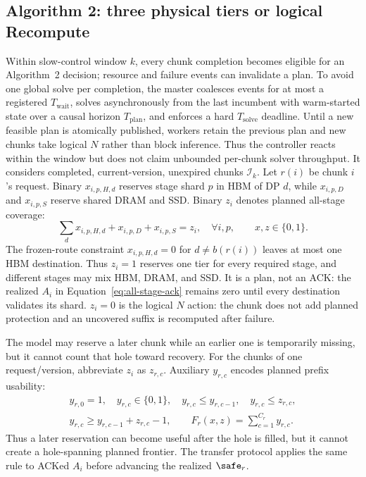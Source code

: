 \subsection{Algorithm 2: three physical tiers or logical Recompute}
\label{sec:alg2}

Within slow-control window $k$, every chunk completion becomes eligible for an
Algorithm~2 decision; resource and failure events can invalidate a plan.  To
avoid one global solve per completion, the master coalesces events for at most
a registered $T_{\mathrm{wait}}$, solves asynchronously from the last incumbent
with warm-started state over a causal horizon $T_{\mathrm{plan}}$, and enforces
a hard $T_{\mathrm{solve}}$ deadline.
Until a new feasible plan is atomically published, workers retain the previous
plan and new chunks take logical $N$ rather than block inference.  Thus the
controller reacts within the window but does not claim unbounded per-chunk
solver throughput.  It considers completed, current-version, unexpired chunks
$\mathcal I_k$.  Let $r(i)$ be chunk $i$'s request.  Binary
$x_{i,p,H,d}$ reserves stage shard $p$ in HBM of DP $d$, while $x_{i,p,D}$ and
$x_{i,p,S}$ reserve shared DRAM and SSD.  Binary $z_i$ denotes planned
all-stage coverage:
\begin{equation}
  \sum_d x_{i,p,H,d}+x_{i,p,D}+x_{i,p,S}=z_i,
  \quad \forall i,p,\qquad x,z\in\{0,1\}.
  \label{eq:actions}
\end{equation}
The frozen-route constraint $x_{i,p,H,d}=0$ for $d\ne b(r(i))$ leaves at most
one HBM destination.  Thus $z_i=1$ reserves one tier for every required stage,
and different stages may mix HBM, DRAM, and SSD.  It is a plan, not an ACK:
the realized $A_i$ in Equation~\ref{eq:all-stage-ack} remains zero until every
destination validates its shard.  $z_i=0$ is the logical $N$ action: the chunk
does not add planned protection and an uncovered suffix is recomputed after
failure.

The model may reserve a later chunk while an earlier one is temporarily
missing, but it cannot count that hole toward recovery.  For the chunks of one
request/version, abbreviate $z_i$ as $z_{r,c}$.  Auxiliary $y_{r,c}$ encodes
planned prefix usability:
\begin{equation}
  \begin{gathered}
  y_{r,0}=1,\quad y_{r,c}\in\{0,1\},\quad
  y_{r,c}\le y_{r,c-1},\quad y_{r,c}\le z_{r,c},\\
  y_{r,c}\ge y_{r,c-1}+z_{r,c}-1,\qquad
  \widehat F_r(x,z)=\sum_{c=1}^{C_r}y_{r,c}.
  \end{gathered}
  \label{eq:planned-frontier}
\end{equation}
Thus a later reservation can become useful after the hole is filled, but it
cannot create a hole-spanning planned frontier.  The transfer protocol applies
the same rule to ACKed $A_i$ before advancing the realized $\safe_r$.

